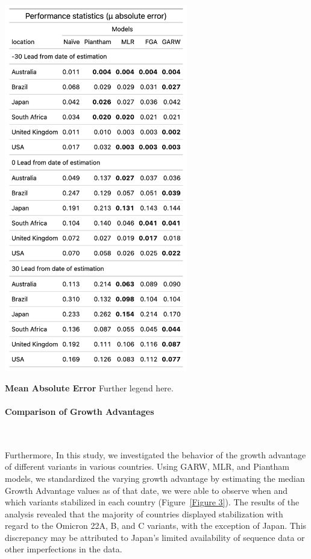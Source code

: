 \documentclass[11pt,oneside,letterpaper]{article}
\begin{document}
\begin{table}[H]
	\centering
	\includegraphics[width=0.6\textwidth]{figures/table1.png}
	\caption{\textbf{Mean Absolute Error}
	Further legend here.
	}
	\label{table1}
\end{table}




\paragraph{Comparison of Growth Advantages}\

Furthermore, In this study, we investigated the behavior of the growth advantage of different variants in various countries.
Using GARW, MLR, and Piantham models, we standardized the varying growth advantage by estimating the median Growth Advantage values as of that date, we were able to observe when and which variants stabilized in each country (Figure~\ref{Figure 3}). 
The results of the analysis revealed that the majority of countries displayed stabilization with regard to the Omicron 22A, B, and C variants, with the exception of Japan.
This discrepancy may be attributed to Japan's limited availability of sequence data or other imperfections in the data.
\end{document}
